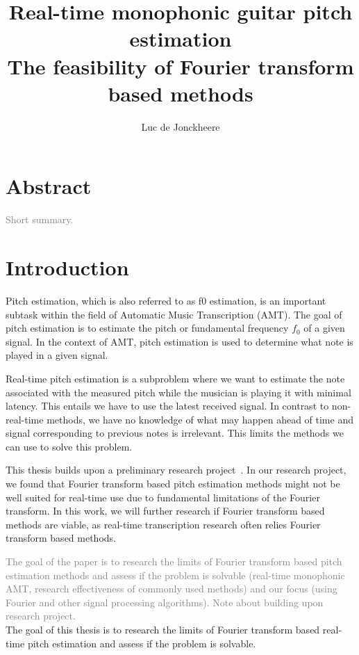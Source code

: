 \documentclass[10pt,twocolumn]{article}
\title{\textbf{Real-time monophonic guitar pitch estimation}\\The feasibility of Fourier transform based methods}
\author{Luc de Jonckheere}
\begin{document}

\maketitle


\section*{Abstract}
\textcolor{gray}{Short summary.}


\section{Introduction}
Pitch estimation, which is also referred to as f0 estimation, is an important subtask within the field of Automatic Music Transcription (AMT). The goal of pitch estimation is to estimate the pitch or fundamental frequency $f_0$ of a given signal. In the context of AMT, pitch estimation is used to determine what note is played in a given signal.

Real-time pitch estimation is a subproblem where we want to estimate the note associated with the measured pitch while the musician is playing it with minimal latency. This entails we have to use the latest received signal. In contrast to non-real-time methods, we have no knowledge of what may happen ahead of time and signal corresponding to previous notes is irrelevant. This limits the methods we can use to solve this problem.

This thesis builds upon a preliminary research project~\cite{ik}. In our research project, we found that Fourier transform based pitch estimation methods might not be well suited for real-time use due to fundamental limitations of the Fourier transform. In this work, we will further research if Fourier transform based methods are viable, as real-time transcription research often relies Fourier transform based methods.

\textcolor{gray}{The goal of the paper is to research the limits of Fourier transform based pitch estimation methods and assess if the problem is solvable (real-time monophonic AMT, research effectiveness of commonly used methods) and our focus (using Fourier and other signal processing algorithms). Note about building upon research project.}\\
The goal of this thesis is to research the limits of Fourier transform based real-time pitch estimation and assess if the problem is solvable.
\end{document}
